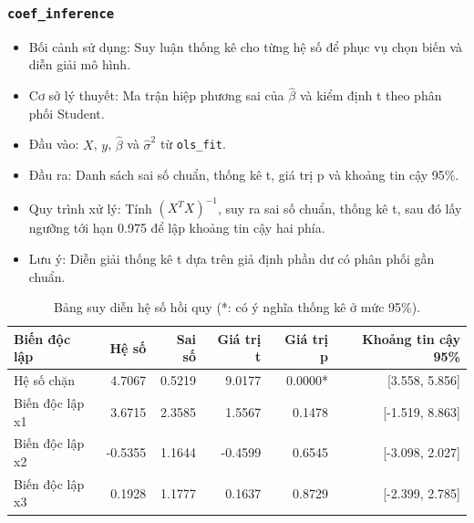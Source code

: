\documentclass[a4paper]{article}
\newcommand{\code}[1]{\colorbox{light-gray}{\texttt{#1}}}
\begin{document}
\subsubsection{\texorpdfstring{\code{coef\_inference}}{coef\_inference}}
\begin{itemize}[leftmargin=*]
    \item Bối cảnh sử dụng: Suy luận thống kê cho từng hệ số để phục vụ chọn biến và diễn giải mô hình.
    \item Cơ sở lý thuyết: Ma trận hiệp phương sai của $\hat{\beta}$ và kiểm định t theo phân phối Student.
    \item Đầu vào: $X$, $y$, $\hat{\beta}$ và $\hat{\sigma}^2$ từ \texttt{ols\_fit}.
    \item Đầu ra: Danh sách sai số chuẩn, thống kê t, giá trị p và khoảng tin cậy 95\%.
    \item Quy trình xử lý: Tính $(X^T X)^{-1}$, suy ra sai số chuẩn, thống kê t, sau đó lấy ngưỡng tới hạn 0.975 để lập khoảng tin cậy hai phía.
    \item Lưu ý: Diễn giải thống kê t dựa trên giả định phần dư có phân phối gần chuẩn.
\end{itemize}
\begin{table}[H]
    \centering
    \small
    \begin{tabular}{lrrrrr}
    \toprule
    \textbf{Biến độc lập} & \textbf{Hệ số} & \textbf{Sai số} & \textbf{Giá trị t} & \textbf{Giá trị p} & \textbf{Khoảng tin cậy 95\%} \\
    \midrule
    Hệ số chặn & 4.7067 & 0.5219 & 9.0177 & 0.0000* & [3.558, 5.856] \\
    Biến độc lập x1 & 3.6715 & 2.3585 & 1.5567 & 0.1478 & [-1.519, 8.863] \\
    Biến độc lập x2 & -0.5355 & 1.1644 & -0.4599 & 0.6545 & [-3.098, 2.027] \\
    Biến độc lập x3 & 0.1928 & 1.1777 & 0.1637 & 0.8729 & [-2.399, 2.785] \\
    \bottomrule
    \end{tabular}
    \caption{Bảng suy diễn hệ số hồi quy (*: có ý nghĩa thống kê ở mức 95\%).}
\end{table}
\end{document}
